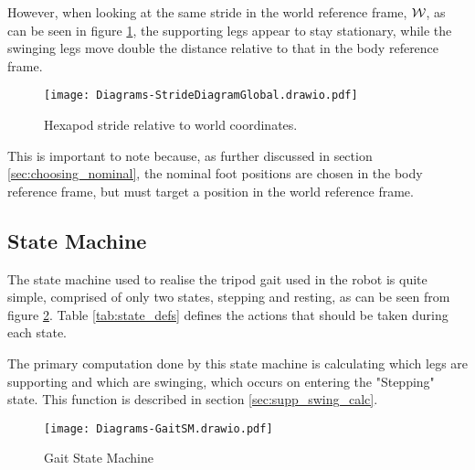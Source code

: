             \newpage
            \noindent
            However, when looking at the same stride in the world reference frame, \(\fworld\), as can be seen in figure \ref{fig:stride_world},
            the supporting legs appear to stay stationary, while the swinging legs move double the distance relative to that in the body reference frame.
            \begin{figure}[h]
                \centering
                \texttt{[image: Diagrams-StrideDiagramGlobal.drawio.pdf]}
                \caption{Hexapod stride relative to world coordinates.}
                \label{fig:stride_world}
            \end{figure}

            \noindent
            This is important to note because, as further discussed in section \ref{sec:choosing_nominal}, the nominal foot positions are chosen in the body reference frame, but must target a
            position in the world reference frame.
        
        \newpage
        \subsection{State Machine}
            The state machine used to realise the tripod gait used in the robot is quite simple, comprised of only two states, stepping and
            resting, as can be seen from figure \ref{fig:gaitSM}. Table \ref{tab:state_defs} defines the actions that should be taken during
            each state.

            The primary computation done by this state machine is calculating which legs are supporting and which are swinging, which occurs
            on entering the "Stepping" state. This function is described in section \ref{sec:supp_swing_calc}.

            \begin{figure}[h]
                \centering
                \texttt{[image: Diagrams-GaitSM.drawio.pdf]}
                \caption{Gait State Machine}
                \label{fig:gaitSM}
            \end{figure}

